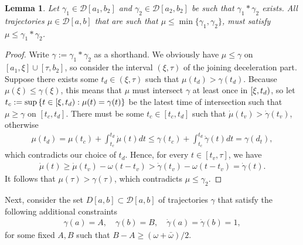 \documentclass[a4paper]{article}
\theoremstyle{definition}
\theoremstyle{plain}
\newtheorem{lemma}{Lemma\hspace{0.25em}\ignorespaces}
\begin{document}
\begin{lemma}
  Let $\gamma_{1} \in \mathcal{D}[a_{1}, b_{2}]$ and
  $\gamma_{2} \in \mathcal{D}[a_{2}, b_{2}]$ be such that $\gamma_{1} * \gamma_{2}$ exists. All
  trajectories $\mu \in \mathcal{D}[a, b]$ that are such that
  $\mu \leq \min\{\gamma_{1}, \gamma_{2}\}$, must satisfy $\mu \leq \gamma_{1} * \gamma_{2}$.
\end{lemma}
\begin{proof}
  Write $\gamma := \gamma_{1} * \gamma_{2}$ as a shorthand. We obviously have
  $\mu \leq \gamma$ on $[a_{1}, \xi] \cup [\tau, b_{2}]$, so consider the interval $(\xi, \tau)$ of the joining
  deceleration part. Suppose there exists some $t_{d} \in (\xi, \tau)$ such that
  $\mu(t_{d}) > \gamma(t_{d})$. Because $\mu(\xi) \leq \gamma(\xi)$, this means that $\mu$ must
  intersect $\gamma$ at least once in $[\xi,t_{d})$, so let
  $t_{c} := \sup \, \{ t \in [\xi,t_{d}) : \mu(t) = \gamma(t) \}$ be the latest
  time of intersection such that $\mu \geq \gamma$ on $[t_{c}, t_{d}]$. There must be
  some $t_{c} \in [t_{c}, t_{d}]$ such that $\dot{\mu}(t_{v}) > \dot{\gamma}(t_{v})$, otherwise
  \begin{align*}
    \mu(t_{d}) = \mu(t_{c}) + \int_{t_{c}}^{t_{d}} \dot{\mu}(t) dt \leq \gamma(t_{c}) + \int_{t_{c}}^{t_{d}} \dot{\gamma}(t) dt = \gamma(d_{t}) ,
  \end{align*}
  which contradicts our choice of $t_{d}$. Hence, for every
  $t \in [t_{v}, \tau]$, we have
  \begin{align*}
    \dot{\mu}(t) \geq \dot{\mu}(t_{v}) - \omega (t - t_{v}) > \dot{\gamma}(t_{v}) - \omega(t - t_{v}) = \dot{\gamma}(t) .
  \end{align*}
  It follows that $\mu(\tau) > \gamma(\tau)$, which contradicts
  $\mu \leq \gamma_{2}$.
\end{proof}

\newpage

Next, consider the set $D[a,b] \subset \mathcal{D}[a, b]$ of trajectories
$\gamma$ that satisfy the following additional constraints
\begin{align}
  \gamma(a) = A, \quad \gamma(b) = B, \quad \dot{\gamma}(a) = \dot{\gamma}(b) = 1 ,
\end{align}
for some fixed $A, B$ such that $B - A \geq (\omega + \bar{\omega}) / 2$.
\end{document}
